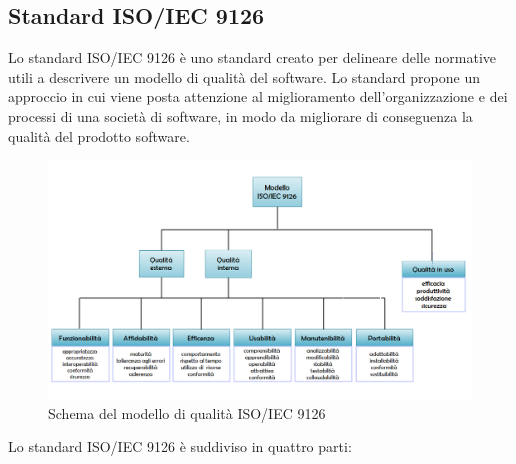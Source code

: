   	\subsection{Standard ISO/IEC 9126}
  	Lo standard ISO/IEC 9126 è uno standard creato per delineare delle normative utili a descrivere un modello di qualità del software. Lo standard propone un approccio in cui viene posta attenzione al miglioramento dell'organizzazione e dei processi di una società di software, in modo da migliorare di conseguenza la qualità del prodotto software.\\
  	\begin{figure}[h]
		\centering
		\includegraphics[width=140mm]{images/iso_9126.png}
		\caption{Schema del modello di qualità ISO/IEC 9126}
		\label{fig:iso9126}
	\end{figure}
  	Lo standard ISO/IEC 9126 è suddiviso in quattro parti:
